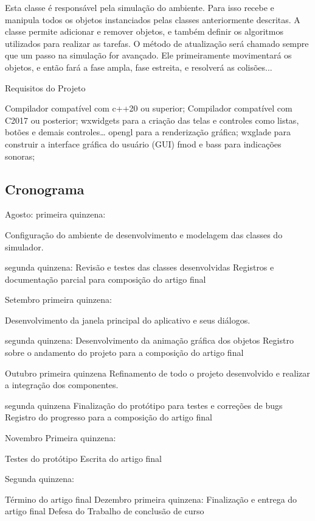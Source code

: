 Esta classe é responsável pela simulação do ambiente. Para isso recebe e manipula todos os objetos instanciados pelas classes anteriormente descritas. A classe permite adicionar e remover objetos, e também definir os algoritmos utilizados
para realizar as tarefas.
O método de atualização será chamado sempre que um passo na simulação for avançado.
Ele primeiramente movimentará os objetos, e então fará a fase ampla, fase
estreita, e resolverá as colisões...

Requisitos do Projeto

Compilador compatível com c++20 ou superior;
Compilador compatível com C2017 ou posterior;
wxwidgets para a criação das telas e controles como listas, botões e demais controles…
opengl para a renderização gráfica;
wxglade para construir a interface gráfica do usuário (GUI)
fmod e bass para indicações sonoras;

\subsection{Cronograma}
Agosto:
primeira quinzena:

Configuração do ambiente de desenvolvimento e modelagem das classes do
simulador.

segunda quinzena:
Revisão e testes das classes desenvolvidas
Registros e documentação parcial para composição do artigo final

Setembro
primeira quinzena:

Desenvolvimento da janela principal do aplicativo e seus diálogos.

segunda quinzena:
Desenvolvimento da animação gráfica dos objetos
Registro sobre o andamento do projeto para a composição do artigo final

Outubro
primeira quinzena
Refinamento de todo o projeto desenvolvido e realizar a integração dos componentes.

segunda quinzena
Finalização do protótipo para testes e correções de bugs
Registro do progresso para a composição do artigo final

Novembro
Primeira quinzena:

Testes do protótipo
Escrita do artigo final

Segunda quinzena:

Término do artigo final
Dezembro
primeira quinzena:
Finalização e entrega do artigo final
Defesa do Trabalho de conclusão de curso



